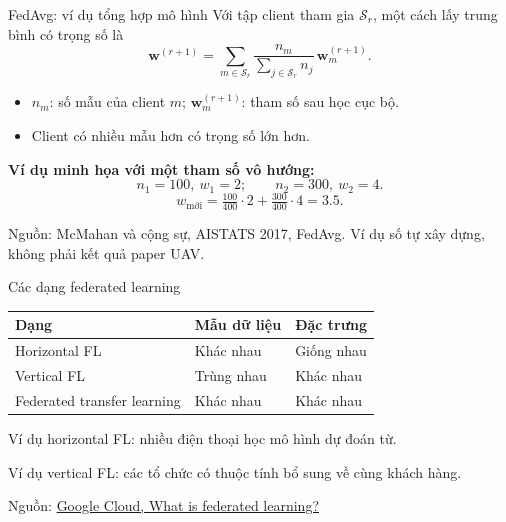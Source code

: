 \documentclass[10pt,aspectratio=43]{beamer}
\newcommand{\source}[1]{\par\vfill{\fontsize{5.8}{7}\selectfont\color{Muted}Nguồn: #1\par}}
\newcommand{\flref}{\source{\href{https://cloud.google.com/discover/what-is-federated-learning}{Google Cloud, What is federated learning?}}}
\begin{document}
\begin{frame}[t]{FedAvg: ví dụ tổng hợp mô hình}
\relax
Với tập client tham gia $\mathcal S_r$, một cách lấy trung bình có trọng số là
\[
\mathbf w^{(r+1)}=\sum_{m\in\mathcal S_r}
\frac{n_m}{\sum_{j\in\mathcal S_r}n_j}\,\mathbf w_m^{(r+1)}.
\]
\begin{itemize}
\item $n_m$: số mẫu của client $m$; $\mathbf w_m^{(r+1)}$: tham số sau học cục bộ.
\item Client có nhiều mẫu hơn có trọng số lớn hơn.
\end{itemize}
\par\medskip
\textbf{Ví dụ minh họa với một tham số vô hướng:}
\[
n_1=100,\ w_1=2;\qquad n_2=300,\ w_2=4.
\]
\[
w_{\text{mới}}=\tfrac{100}{400}\cdot2+\tfrac{300}{400}\cdot4=3.5.
\]
\source{McMahan và cộng sự, AISTATS 2017, FedAvg. Ví dụ số tự xây dựng, không phải kết quả paper UAV.}
\end{frame}

\begin{frame}[t]{Các dạng federated learning}
\relax
\renewcommand{\arraystretch}{1.6}
\begin{tabularx}{\textwidth}{@{}>{\raggedright\arraybackslash}p{3.0cm}YY@{}}
\toprule
\textbf{Dạng} & \textbf{Mẫu dữ liệu} & \textbf{Đặc trưng}\\
\midrule
Horizontal FL & Khác nhau & Giống nhau\\
Vertical FL & Trùng nhau & Khác nhau\\
Federated transfer learning & Khác nhau & Khác nhau\\
\bottomrule
\end{tabularx}
\par\bigskip
Ví dụ horizontal FL: nhiều điện thoại học mô hình dự đoán từ.
\par\medskip
Ví dụ vertical FL: các tổ chức có thuộc tính bổ sung về cùng khách hàng.
\flref
\end{frame}
\end{document}
